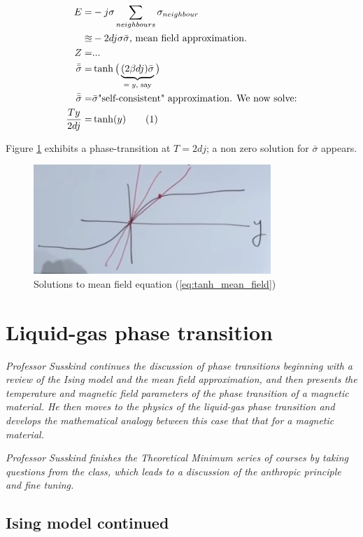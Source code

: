 \documentclass[]{article}
\newcommand\numberthis{\addtocounter{equation}{1}\tag{\theequation}}
\begin{document}
\begin{align*}
E =& -j \sigma \sum_{neighbours} \sigma_{neighbour}\\
\approxeq &-2 d j \sigma \bar{\sigma}\text{, mean field approximation.}\\
Z =&...\\
\bar{\bar{\sigma}} =& \tanh\big(\underbrace{(2 \beta d j ) \bar{\sigma}}_\text{$=y$, say}\big)\\
\bar{\bar{\sigma}} =& \bar{\sigma} \text{"self-consistent" approximation. We now solve:}\\
\frac{T y}{2 d j} =& \tanh(y)\numberthis \label{eq:tanh_mean_field}
\end{align*}  

Figure \ref{fig:tanh_mean_field} exhibits a phase-transition at $T=2dj$; a non zero solution for $\bar{\sigma}$ appears.

\begin{figure}[H]
	\caption{Solutions to mean field equation (\ref{eq:tanh_mean_field})}\label{fig:tanh_mean_field}
	\includegraphics[width=0.8\textwidth]{tanh_mean_field}
\end{figure}
\section{Liquid-gas phase transition}

\textit{Professor Susskind continues the discussion of phase transitions beginning with a review of the Ising model and the mean field approximation, and then presents the temperature and magnetic field parameters of the phase transition of a magnetic material. He then moves to the physics of the liquid-gas phase transition and develops the mathematical analogy between this case that that for a magnetic material.}

\textit{Professor Susskind finishes the Theoretical Minimum series of courses by taking questions from the class, which leads to a discussion of the anthropic principle and fine tuning.}

\subsection{Ising model continued}
\end{document}
